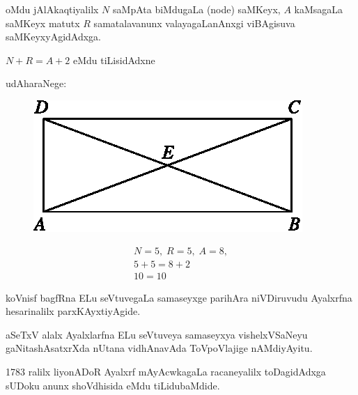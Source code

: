 oMdu jAlAkaqtiyalilx $N$ saMpAta biMdugaLa {\rm (node)} saMKeyx, $A$ kaMsagaLa saMKeyx matutx $R$ samatalavanunx valayagaLanAnxgi viBAgisuva saMKeyxyAgidAdxga.

$N+R=A+2$ eMdu tiLisidAdxne 

udAharaNege:
\begin{figure}[H]
\begin{minipage}[c]{4cm}
\centering
\includegraphics{src/figures/m_149.eps}
\end{minipage}
\qquad\qquad 
\begin{minipage}[c]{4cm}
\begin{gather*}
N = 5, \; R=5, \; A = 8, \\
5+5 = 8+2\\
10 = 10
\end{gather*}
\end{minipage}
\end{figure}

koVnisf bagfRna ELu seVtuvegaLa samaseyxge parihAra niVDiruvudu Ayalxrfna hesarinalilx parxKAyxtiyAgide.

aSeTxV alalx Ayalxlarfna ELu seVtuveya samaseyxya vishelxVSaNeyu gaNitashAsatxrXda nUtana vidhAnavAda ToVpoVlajige nAMdiyAyitu.

{\rm 1783} ralilx liyonADoR Ayalxrf mAyAcwkagaLa racaneyalilx toDagidAdxga sUDoku anunx shoVdhisida eMdu tiLidubaMdide.

